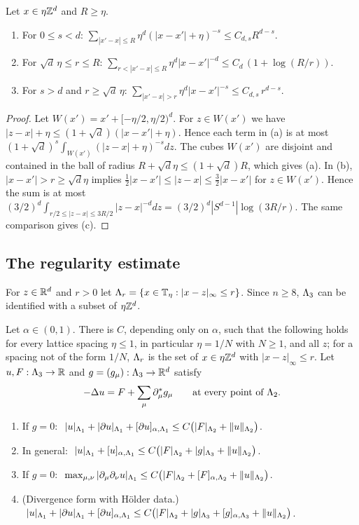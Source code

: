 \begin{lemma}\label{lem:lattice-sums}
Let $x\in\eta\mathbb Z^d$ and $R\ge\eta$.
\begin{enumerate}[label=(\alph*)]
\item For $0\le s<d$: $\sum_{|x'-x|\le R}\eta^d(|x-x'|+\eta)^{-s}\le C_{d,s}R^{d-s}$.
\item For $\sqrt d\,\eta\le r\le R$: $\sum_{r<|x'-x|\le R}\eta^d|x-x'|^{-d}\le C_d\,(1+\log(R/r))$.
\item For $s>d$ and $r\ge\sqrt d\,\eta$: $\sum_{|x'-x|>r}\eta^d|x-x'|^{-s}\le C_{d,s}\,r^{d-s}$.
\end{enumerate}
\end{lemma}

\begin{proof}
Let $W(x')=x'+[-\eta/2,\eta/2)^d$. For $z\in W(x')$ we have $|z-x|+\eta\le(1+\sqrt d)(|x-x'|+\eta)$. Hence each term in (a) is at most $(1+\sqrt d)^s\int_{W(x')}(|z-x|+\eta)^{-s}dz$. The cubes $W(x')$ are disjoint and contained in the ball of radius $R+\sqrt d\eta\le(1+\sqrt d)R$, which gives (a). In (b), $|x-x'|>r\ge\sqrt d\eta$ implies $\frac12|x-x'|\le|z-x|\le\frac32|x-x'|$ for $z\in W(x')$. Hence the sum is at most $(3/2)^d\int_{r/2\le|z-x|\le3R/2}|z-x|^{-d}dz=(3/2)^d|S^{d-1}|\log(3R/r)$. The same comparison gives (c).
\end{proof}

\subsection{The regularity estimate}\label{ss:6.2}

For $z\in\mathbb R^d$ and $r>0$ let $\Lambda_r=\{x\in\mathbb T_\eta:|x-z|_\infty\le r\}$. Since $n\ge8$, $\Lambda_3$ can be identified with a subset of $\eta\mathbb Z^d$.

\begin{theorem}\label{thm:local-regularity}
Let $\alpha\in(0,1)$. There is $C$, depending only on $\alpha$, such that the following holds for every lattice spacing $\eta\le1$, in particular $\eta=1/N$ with $N\ge1$, and all $z$; for a spacing not of the form $1/N$, $\Lambda_r$ is the set of $x\in\eta\mathbb Z^d$ with $|x-z|_\infty\le r$. Let $u,F:\Lambda_3\to\mathbb R$ and $g=(g_\mu):\Lambda_3\to\mathbb R^d$ satisfy
\[
-\Delta u=F+\sum_\mu\partial^*_\mu g_\mu\qquad\text{at every point of }\Lambda_2 .
\]
\begin{enumerate}[label=(\alph*)]
\item If $g=0$: $\ |u|_{\Lambda_1}+|\partial u|_{\Lambda_1}+[\partial u]_{\alpha,\Lambda_1}\le C\big(|F|_{\Lambda_2}+\|u\|_{\Lambda_2}\big)$.
\item In general: $\ |u|_{\Lam_1}+\Hol{u}{\Lam_1}\le C\big(|F|_{\Lam_2}+|g|_{\Lam_3}+\|u\|_{\Lam_2}\big)$.
\item If $g=0$: $\ \max_{\mu,\nu}|\partial_\mu\partial_\nu u|_{\Lambda_1}\le C\big(|F|_{\Lambda_2}+[F]_{\alpha,\Lambda_2}+\|u\|_{\Lambda_2}\big)$.
\item (Divergence form with H\"older data.) $\ |u|_{\Lam_1}+|\partial u|_{\Lam_1}+\Hol{\partial u}{\Lam_1}\le C\big(|F|_{\Lam_2}+|g|_{\Lam_3}+\Hol g{\Lam_3}+\|u\|_{\Lam_2}\big)$.
\end{enumerate}
\end{theorem}

